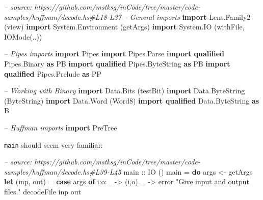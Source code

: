 \documentclass[]{article}
\newenvironment{Shaded}{}{}
\newcommand{\KeywordTok}[1]{\textcolor[rgb]{0.00,0.44,0.13}{\textbf{#1}}}
\newcommand{\DataTypeTok}[1]{\textcolor[rgb]{0.56,0.13,0.00}{#1}}
\newcommand{\StringTok}[1]{\textcolor[rgb]{0.25,0.44,0.63}{#1}}
\newcommand{\CommentTok}[1]{\textcolor[rgb]{0.38,0.63,0.69}{\textit{#1}}}
\newcommand{\OtherTok}[1]{\textcolor[rgb]{0.00,0.44,0.13}{#1}}
\newcommand{\FunctionTok}[1]{\textcolor[rgb]{0.02,0.16,0.49}{#1}}
\newcommand{\NormalTok}[1]{#1}
\begin{document}
\begin{Shaded}
\begin{Highlighting}[]
\CommentTok{-- source: https://github.com/mstksg/inCode/tree/master/code-samples/huffman/decode.hs#L18-L37}
\CommentTok{-- General imports}
\KeywordTok{import }\DataTypeTok{Lens.Family2}\NormalTok{       (view)}
\KeywordTok{import }\DataTypeTok{System.Environment}\NormalTok{ (getArgs)}
\KeywordTok{import }\DataTypeTok{System.IO}\NormalTok{          (withFile, }\DataTypeTok{IOMode}\NormalTok{(..))}

\CommentTok{-- Pipes imports}
\KeywordTok{import }\DataTypeTok{Pipes}
\KeywordTok{import }\DataTypeTok{Pipes.Parse}
\KeywordTok{import qualified} \DataTypeTok{Pipes.Binary}     \KeywordTok{as} \DataTypeTok{PB}
\KeywordTok{import qualified} \DataTypeTok{Pipes.ByteString} \KeywordTok{as} \DataTypeTok{PB}
\KeywordTok{import qualified} \DataTypeTok{Pipes.Prelude}    \KeywordTok{as} \DataTypeTok{PP}

\CommentTok{-- Working with Binary}
\KeywordTok{import }\DataTypeTok{Data.Bits}\NormalTok{                 (testBit)}
\KeywordTok{import }\DataTypeTok{Data.ByteString}\NormalTok{           (}\DataTypeTok{ByteString}\NormalTok{)}
\KeywordTok{import }\DataTypeTok{Data.Word}\NormalTok{                 (}\DataTypeTok{Word8}\NormalTok{)}
\KeywordTok{import qualified} \DataTypeTok{Data.ByteString} \KeywordTok{as} \DataTypeTok{B}

\CommentTok{-- Huffman imports}
\KeywordTok{import }\DataTypeTok{PreTree}
\end{Highlighting}
\end{Shaded}

\texttt{main} should seem very familiar:

\begin{Shaded}
\begin{Highlighting}[]
\CommentTok{-- source: https://github.com/mstksg/inCode/tree/master/code-samples/huffman/decode.hs#L39-L45}
\OtherTok{main ::} \DataTypeTok{IO}\NormalTok{ ()}
\NormalTok{main }\FunctionTok{=} \KeywordTok{do}
\NormalTok{    args     }\OtherTok{<-}\NormalTok{ getArgs}
    \KeywordTok{let}\NormalTok{ (inp, out)  }\FunctionTok{=} \KeywordTok{case}\NormalTok{ args }\KeywordTok{of}
\NormalTok{                        i}\FunctionTok{:}\NormalTok{o}\FunctionTok{:}\NormalTok{_      }\OtherTok{->}\NormalTok{ (i,o)}
\NormalTok{                        _          }\OtherTok{->}\NormalTok{ error }\StringTok{"Give input and output files."}
\NormalTok{    decodeFile inp out}
\end{Highlighting}
\end{Shaded}
\end{document}

